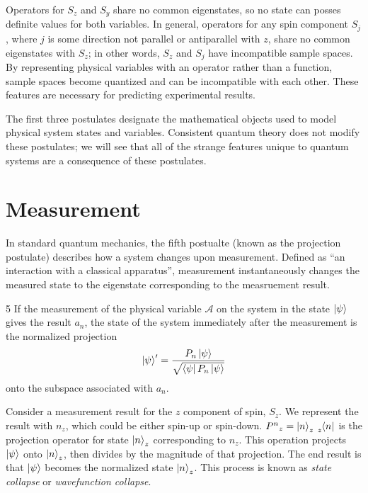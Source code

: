 Operators for $S_z$ and $S_y$ share no common eigenstates, so no state can posses definite values for both variables. In general, operators for any spin component $S_j$, where $j$ is some direction not parallel or antiparallel with $z$, share no common eigenstates with $S_z$; in other words, $S_z$ and $S_j$ have incompatible sample spaces. By representing physical variables with an operator rather than a function, sample spaces become quantized and can be incompatible with each other. These features are necessary for predicting experimental results.

The first three postulates designate the mathematical objects used to model physical system states and variables. Consistent quantum theory does not modify these postulates; we will see that all of the strange features unique to quantum systems are a consequence of these postulates.

\section{Measurement}
\label{Section:Measurement}

In standard quantum mechanics, the fifth postualte (known as the projection postulate) describes how a system changes upon measurement. Defined as ``an interaction with a classical apparatus'', measurement instantaneously changes the measured state to the eigenstate corresponding to the measruement result.

\begin{Thm:Postulate}{5}
    If the measurement of the physical variable $\mathcal{A}$ on the system in the state $\ket{\psi}$ gives the result $a_n$, the state of the system immediately after the measurement is the normalized projection
    \begin{align*}
        \ket{\psi}^\prime = \frac{P_n\ket{\psi}}{\sqrt{\bra{\psi}P_n\ket{\psi}
        }}
    \end{align*}
    onto the subspace associated with $a_n$.
\end{Thm:Postulate}

Consider a measurement result for the $z$ component of spin, $S_z$. We represent the result with $n_z$, which could be either spin-up or spin-down. ${P^n}_z = \ket{n}_z\tensor[_z]{\bra{n}}{}$ is the projection operator for state $\ket{n}_z$ corresponding to $n_z$. This operation projects $\ket{\psi}$ onto $\ket{n}_z$, then divides by the magnitude of that projection. The end result is that $\ket{\psi}$ becomes the normalized state $\ket{n}_z$. This process is known as \textit{state collapse} or \textit{wavefunction collapse}.

